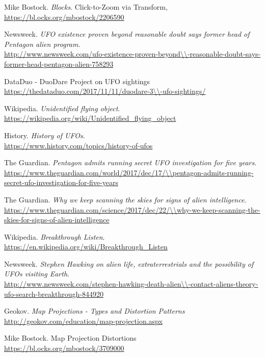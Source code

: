 \documentclass[journal]{vgtc}                %
\begin{document}
\begin{thebibliography}{9}

Mike Bostock.
\textit{Blocks}. 
Click-to-Zoom via Transform,
\\\url{https://bl.ocks.org/mbostock/2206590}

Newsweek.
\textit{UFO existence proven beyond reasonable doubt says former head of Pentagon alien program}.
\\\url{http://www.newsweek.com/ufo-existence-proven-beyond\\-reasonable-doubt-says-former-head-pentagon-alien-758293}

DataDuo - DuoDare Project on UFO sightings
\\\url{https://thedataduo.com/2017/11/11/duodare-3\\-ufo-sightings/}

Wikipedia.
\textit{Unidentified flying object}.
\\\url{https://wikipedia.org/wiki/Unidentified\_flying\_object}

History.
\textit{History of UFOs}.
\\\url{https://www.history.com/topics/history-of-ufos}

The Guardian.
\textit{Pentagon admits running secret UFO investigation for five years}.
\\\url{https://www.theguardian.com/world/2017/dec/17/\\pentagon-admits-running-secret-ufo-investigation-for-five-years}

The Guardian.
\textit{Why we keep scanning the skies for signs of alien intelligence}.
\\\url{https://www.theguardian.com/science/2017/dec/22/\\why-we-keep-scanning-the-skies-for-signs-of-alien-intelligence}

Wikipedia.
\textit{Breakthrough Listen}.
\\\url{https://en.wikipedia.org/wiki/Breakthrough\_Listen}

Newsweek.
\textit{Stephen Hawking on alien life, extraterrestrials and the possibility of UFOs visiting Earth}.
\\\url{http://www.newsweek.com/stephen-hawking-death-alien\\-contact-aliens-theory-ufo-search-breakthrough-844920}

Geokov.
\textit{Map Projections - Types and Distortion Patterns}
\\\url{http://geokov.com/education/map-projection.aspx}

Mike Bostock.
Map Projection Distortions
\\\url{https://bl.ocks.org/mbostock/3709000}

\end{thebibliography}







%

%
%
%


\end{document}
